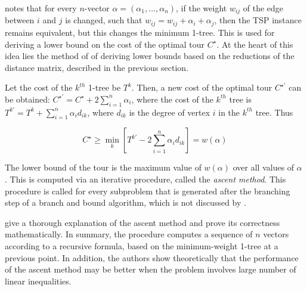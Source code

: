 \documentclass[a4paper,12pt]{article}
\begin{document}
\citet{Flood56} notes that for every $n$-vector $\alpha = (\alpha_{1},...,\alpha_{n})$, if the weight $w_{ij}$ of the edge between $i$ and $j$ is changed, such that $w_{ij} = w_{ij} + \alpha_{i} + \alpha_{j}$, then the TSP instance remains equivalent, but this changes the minimum 1-tree. This is used for deriving a lower bound on the cost of the optimal tour $C^{\star}$. At the heart of this idea lies the method of \citet{Little63} of deriving lower bounds based on the reductions of the distance matrix, described in the previous section.

Let the cost of the $k^{th}$ 1-tree be $T^{k}$. Then, a new cost of the optimal tour $C^{\star\prime}$ can be obtained: $C^{\star\prime} = C^{\star} + 2 \sum^{n}_{i=1} \alpha_{i}$, where the cost of the $k^{th}$ tree is $T^{k\prime} = T^{k} + \sum^{n}_{i=1} \alpha_{i} d_{ik}$, where $d_{ik}$ is the degree of vertex $i$ in the $k^{th}$ tree. Thus

$$ C^{\star} \geq \underset{k}{\min}[T^{k\prime} - 2 \sum^{n}_{i=1} \alpha_{i}d_{ik}] = w(\alpha)$$

The lower bound of the tour is the maximum value of $w(\alpha)$ over all values of $\alpha$ \citet{HeldK71}. This is computed via an iterative procedure, called the \textit{ascent method}. This procedure is called for every subproblem that is generated after the branching step of a branch and bound algorithm, which is not discussed by \citet{HeldK71}.

\citet{HeldK71} give a thorough explanation of the ascent method and prove its correctness mathematically. In summary, the procedure computes a sequence of $n$ vectors according to a recursive formula, based on the minimum-weight 1-tree at a previous point. In addition, the authors show theoretically that the performance of the ascent method may be better when the problem involves large number of linear inequalities.


\end{document}
